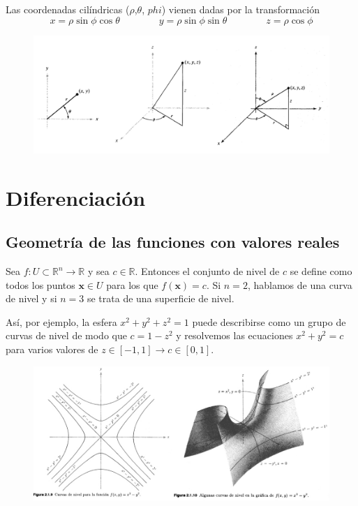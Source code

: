 \documentclass[a4paper]{article}
\begin{document}
Las coordenadas cilíndricas ($\rho$,$\theta$, $phi$) vienen dadas por la transformación
\[ x = \rho\sin\phi\cos\theta \qquad \qquad y = \rho\sin\phi\sin\theta \qquad\qquad z = \rho\cos\phi \]

\begin{figure}[h!]
	\centering
	\includegraphics[width=0.87\linewidth]{./imagenes/coords.jpg}
\end{figure}

\section{Diferenciación}
\subsection{Geometría de las funciones con valores reales}
Sea $f:U\subset\mathbb{R}^n\rightarrow\mathbb{R}$ y sea $c \in \mathbb{R}$. Entonces el conjunto de nivel de $c$ se define como todos los puntos $\textbf{x}\in U$ para los que $f(\textbf{x})=c$. Si $n=2$, hablamos de una curva de nivel y si $n=3$ se trata de una superficie de nivel. 

Así, por ejemplo, la esfera $x^2+y^2+z^2=1$ puede describirse como un grupo de curvas de nivel de modo que $c = 1-z^2$ y resolvemos las ecuaciones $x^2 + y^2 = c$ para varios valores de $z \in [-1,1] \rightarrow c \in [0, 1] $. 

\begin{figure}[h!]
	\centering
	\includegraphics[width=0.87\linewidth]{./imagenes/curvas.jpg}
\end{figure}
\end{document}
